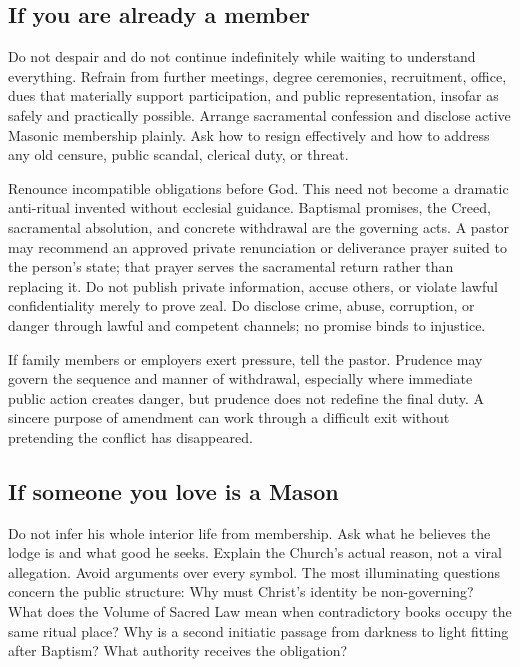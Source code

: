 \subsection{If you are already a member}

Do not despair and do not continue indefinitely while waiting to understand everything. Refrain from further meetings, degree ceremonies, recruitment, office, dues that materially support participation, and public representation, insofar as safely and practically possible. Arrange sacramental confession and disclose active Masonic membership plainly. Ask how to resign effectively and how to address any old censure, public scandal, clerical duty, or threat.

Renounce incompatible obligations before God. This need not become a dramatic anti-ritual invented without ecclesial guidance. Baptismal promises, the Creed, sacramental absolution, and concrete withdrawal are the governing acts. A pastor may recommend an approved private renunciation or deliverance prayer suited to the person's state; that prayer serves the sacramental return rather than replacing it. Do not publish private information, accuse others, or violate lawful confidentiality merely to prove zeal. Do disclose crime, abuse, corruption, or danger through lawful and competent channels; no promise binds to injustice.

If family members or employers exert pressure, tell the pastor. Prudence may govern the sequence and manner of withdrawal, especially where immediate public action creates danger, but prudence does not redefine the final duty. A sincere purpose of amendment can work through a difficult exit without pretending the conflict has disappeared.

\subsection{If someone you love is a Mason}

Do not infer his whole interior life from membership. Ask what he believes the lodge is and what good he seeks. Explain the Church's actual reason, not a viral allegation. Avoid arguments over every symbol. The most illuminating questions concern the public structure: Why must Christ's identity be non-governing? What does the Volume of Sacred Law mean when contradictory books occupy the same ritual place? Why is a second initiatic passage from darkness to light fitting after Baptism? What authority receives the obligation?

